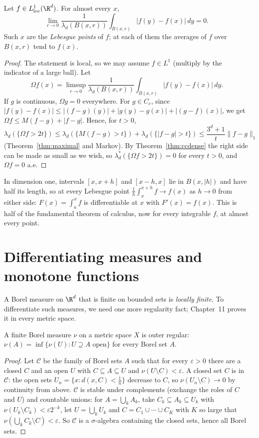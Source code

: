 \begin{theorem}\label{thm:lebdiff}
Let $f\in L^1_{\mathrm{loc}}(\R^d)$. For almost every $x$,
\[\lim_{r\to0}\frac1{\lambda_d(B(x,r))}\int_{B(x,r)}|f(y)-f(x)|\,dy=0.\]
Such $x$ are the \emph{Lebesgue points} of $f$; at each of them the averages of $f$ over $B(x,r)$ tend to $f(x)$.
\end{theorem}
\begin{proof}
The statement is local, so we may assume $f\in L^1$ (multiply by the indicator of a large ball). Let \[\Omega f(x)=\limsup_{r\to0}\frac1{\lambda_d(B(x,r))}\int_{B(x,r)}|f(y)-f(x)|\,dy.\] If $g$ is continuous, $\Omega g=0$
everywhere. For $g\in C_c$, since $|f(y)-f(x)|\le|(f-g)(y)|+|g(y)-g(x)|+|(g-f)(x)|$, we get $\Omega f\le M(f-g)+|f-g|$. Hence, for $t>0$,
\[\lambda_d(\{\Omega f>2t\})\le\lambda_d(\{M(f-g)>t\})+\lambda_d(\{|f-g|>t\})\le\frac{3^d+1}t\|f-g\|_1\]
(Theorem~\ref{thm:maximal} and Markov). By Theorem~\ref{thm:ccdense} the right side can be made as small as we wish, so $\lambda_d^*(\{\Omega f>2t\})=0$ for every $t>0$, and $\Omega f=0$ a.e.
\end{proof}

In dimension one, intervals $[x,x+h]$ and $[x-h,x]$ lie in $B(x,|h|)$ and have half its length, so at every Lebesgue point $\frac1h\int_x^{x+h}f\to f(x)$ as $h\to0$ from either side: $F(x)=\int_a^xf$ is
differentiable at $x$ with $F'(x)=f(x)$. This is half of the fundamental theorem of calculus, now for every integrable $f$, at almost every point.

\section{Differentiating measures and monotone functions}

A Borel measure on $\R^d$ that is finite on bounded sets is \emph{locally finite}. To differentiate such measures, we need one more regularity fact; Chapter~11 proves it in every metric space.

\begin{lemma}\label{lem:outerreg}
A finite Borel measure $\nu$ on a metric space $X$ is outer regular: $\nu(A)=\inf\{\nu(U):U\supseteq A\text{ open}\}$ for every Borel set $A$.
\end{lemma}
\begin{proof}
Let $\mathcal C$ be the family of Borel sets $A$ such that for every $\varepsilon>0$ there are a closed $C$ and an open $U$ with $C\subseteq A\subseteq U$ and $\nu(U\setminus C)<\varepsilon$. A closed set $C$ is in $\mathcal C$: the open
sets $U_n=\{x:d(x,C)<\frac1n\}$ decrease to $C$, so $\nu(U_n\setminus C)\to0$ by continuity from above. $\mathcal C$ is stable under complements (exchange the roles of $C$ and $U$) and countable unions: for $A=\bigcup_kA_k$,
take $C_k\subseteq A_k\subseteq U_k$ with $\nu(U_k\setminus C_k)<\varepsilon2^{-k}$, let $U=\bigcup_kU_k$ and $C=C_1\cup\cdots\cup C_K$ with $K$ so large that $\nu(\bigcup_kC_k\setminus C)<\varepsilon$. So $\mathcal C$ is a $\sigma$-algebra
containing the closed sets, hence all Borel sets.
\end{proof}


